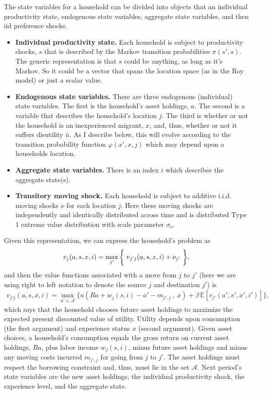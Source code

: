 \documentclass[12pt,pdftex]{article}
\begin{document}
The state variables for a household can be divided into objects that an individual productivity state, endogenous state variables, aggregate state variables, and then iid preference shocks.
\begin{itemize}
\item \textbf{Individual productivity state.} Each household is subject to productivity shocks, $s$ that is described by the Markov transition probabilities $\pi(s',s)$. The generic representation is that $s$ could be anything, as long as it's Markov. So it could be a vector that spans the location space (as in the Roy model) or just a scalar value.

\item \textbf{Endogenous state variables.} There are three endogenous (individual) state variables. The first is the household's asset holdings, $a$. The second is a variable that describes the household's location $j$. The third is whether or not the household is an inexperienced migrant, $x$, and, thus, whether or not it suffers disutility $\bar u$. As I describe below, this will evolve according to the transition probability function $\varphi(x',x, j)$ which may depend upon a households location.

\item \textbf{Aggregate state variables.} There is an index $i$ which describes the aggregate state(s).

\item \textbf{Transitory moving shock.} Each household is subject to additive i.i.d. moving shocks $\nu$ for each location $j$. Here these moving shocks are independently and identically distributed across time and is distributed Type 1 extreme value distribution with scale parameter $\sigma_{\nu}$.
\end{itemize}
Given this representation, we can express the household's problem as
\begin{align}
\small
v_j(a, s, x, i) = \max_{j'} \bigg\{ \ v_{j'j}(a, s, x, i) + \nu_{j'} \ \bigg \},
\label{appendix-eq:value_fun}
\end{align}
and then the value functions associated with a move from $j$ to $j'$ (here we are using right to left notation to denote the source $j$ and destination $j'$) is
\begin{align}
v_{j'j}(a, s, x, i) = \max_{a'\in \mathcal{A}}\bigg  \{ u(Ra + w_{j}(s, i) - a' - m_{j',j} \ , \  x)  + \beta \, \mathbb{E} [v_{j'}(a', s', x', i')]  \bigg\},
\label{appendix-eq:value_fun_locaiton}
\end{align}
which says that the household chooses future asset holdings to maximize the expected present discounted value of utility.  Utility depends upon consumption (the first argument) and experience status $x$ (second argument).  Given asset choices, a household's consumption equals the gross return on current asset holdings, $Ra$, plus labor income $w_{j}(s, i)$, minus future asset holdings and minus any moving costs incurred $m_{j',j}$ for going from $j$ to $j'$. The asset holdings must respect the borrowing constraint and, thus, must lie in the set $\mathcal{A}$. Next period's state variables are the new asset holdings, the individual productivity shock, the experience level, and the aggregate state.
\end{document}
